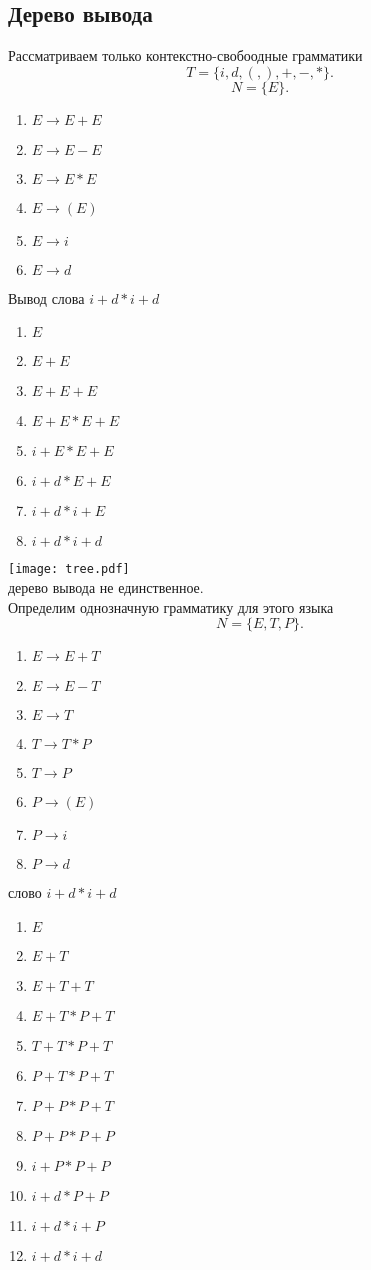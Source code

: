 \documentclass[14pt]{extarticle}
\begin{document}
\subsection{Дерево вывода}
Рассматриваем только контекстно-свобоодные грамматики
\[
    T = \{i,d,(,),+,-,*\}
.\] 
\[
    N = \{E\}
.\] 
\begin{enumerate}
    \item $E \to E + E$
    \item  $E \to E - E$
    \item  $E \to E*E$
    \item  $E \to (E)$
    \item  $E \to i$
    \item  $E \to d$
\end{enumerate}
Вывод слова $i + d * i + d$
 \begin{enumerate}
    \item $E$
    \item  $E + E$
    \item  $E + E +E$
    \item  $E + E * E + E$
    \item  $i +E * E +E$
    \item  $i + d * E + E$
    \item  $i + d * i + E$
    \item  $i + d * i + d$
\end{enumerate}
\texttt{[image: tree.pdf]}\\
дерево вывода не единственное.\\
Определим однозначную грамматику для этого языка
\[
    N = \{E,T,P\}
.\] 
\begin{enumerate}
    \item $E \to E + T$
    \item  $E \to E - T$
    \item  $E \to T$
    \item  $T \to T * P$
    \item  $T \to P$
    \item  $P \to (E)$
    \item  $P \to i$
    \item  $P \to d$
\end{enumerate}
слово $i + d* i + d$
 \begin{enumerate}
    \item $E$
    \item  $ E + T$
    \item  $E + T + T$
    \item $E + T * P + T$
    \item  $T + T * P + T$
    \item  $P +T * P + T$
    \item  $P + P * P + T$
     \item $P + P * P + P$
     \item $i + P * P + P$
     \item $i + d * P + P$
    \item $i + d * i +P$
    \item  $i + d * i + d$
\end{enumerate}
\end{document}

